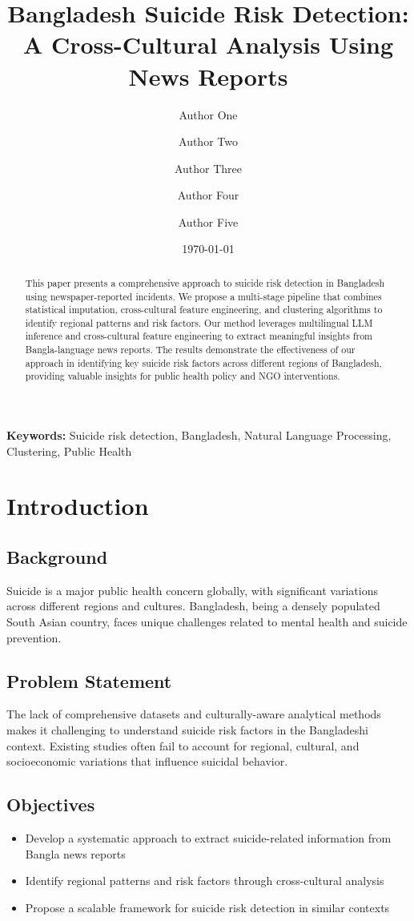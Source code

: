 \documentclass[12pt,a4paper]{article}
\title{\textbf{Bangladesh Suicide Risk Detection: A Cross-Cultural Analysis Using News Reports}}
\author[1]{Author One}
\author[1]{Author Two}
\author[1]{Author Three}
\author[1]{Author Four}
\author[1]{Author Five}
\affil[1]{Department of Computer Science, University Name, Bangladesh}
\date{\today}
\begin{document}
\maketitle

\begin{abstract}
This paper presents a comprehensive approach to suicide risk detection in Bangladesh using newspaper-reported incidents. We propose a multi-stage pipeline that combines statistical imputation, cross-cultural feature engineering, and clustering algorithms to identify regional patterns and risk factors. Our method leverages multilingual LLM inference and cross-cultural feature engineering to extract meaningful insights from Bangla-language news reports. The results demonstrate the effectiveness of our approach in identifying key suicide risk factors across different regions of Bangladesh, providing valuable insights for public health policy and NGO interventions.
\end{abstract}

\textbf{Keywords:} Suicide risk detection, Bangladesh, Natural Language Processing, Clustering, Public Health

\tableofcontents
\newpage

\section{Introduction}

\subsection{Background}
Suicide is a major public health concern globally, with significant variations across different regions and cultures. Bangladesh, being a densely populated South Asian country, faces unique challenges related to mental health and suicide prevention.

\subsection{Problem Statement}
The lack of comprehensive datasets and culturally-aware analytical methods makes it challenging to understand suicide risk factors in the Bangladeshi context. Existing studies often fail to account for regional, cultural, and socioeconomic variations that influence suicidal behavior.

\subsection{Objectives}
\begin{itemize}
    \item Develop a systematic approach to extract suicide-related information from Bangla news reports
    \item Identify regional patterns and risk factors through cross-cultural analysis
    \item Propose a scalable framework for suicide risk detection in similar contexts
\end{itemize}
\end{document}
